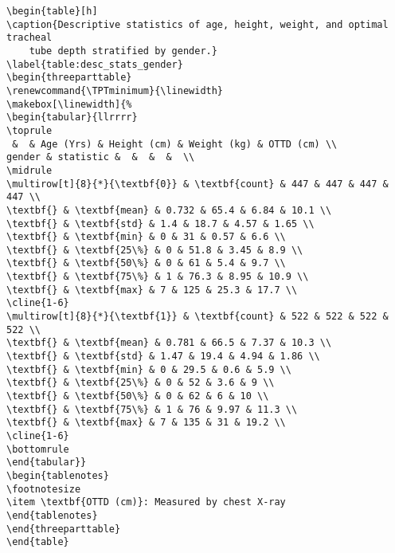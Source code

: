 \documentclass[11pt]{article}
\begin{document}
\begin{Verbatim}[tabsize=4]
\begin{table}[h]
\caption{Descriptive statistics of age, height, weight, and optimal tracheal
	tube depth stratified by gender.}
\label{table:desc_stats_gender}
\begin{threeparttable}
\renewcommand{\TPTminimum}{\linewidth}
\makebox[\linewidth]{%
\begin{tabular}{llrrrr}
\toprule
 &  & Age (Yrs) & Height (cm) & Weight (kg) & OTTD (cm) \\
gender & statistic &  &  &  &  \\
\midrule
\multirow[t]{8}{*}{\textbf{0}} & \textbf{count} & 447 & 447 & 447 & 447 \\
\textbf{} & \textbf{mean} & 0.732 & 65.4 & 6.84 & 10.1 \\
\textbf{} & \textbf{std} & 1.4 & 18.7 & 4.57 & 1.65 \\
\textbf{} & \textbf{min} & 0 & 31 & 0.57 & 6.6 \\
\textbf{} & \textbf{25\%} & 0 & 51.8 & 3.45 & 8.9 \\
\textbf{} & \textbf{50\%} & 0 & 61 & 5.4 & 9.7 \\
\textbf{} & \textbf{75\%} & 1 & 76.3 & 8.95 & 10.9 \\
\textbf{} & \textbf{max} & 7 & 125 & 25.3 & 17.7 \\
\cline{1-6}
\multirow[t]{8}{*}{\textbf{1}} & \textbf{count} & 522 & 522 & 522 & 522 \\
\textbf{} & \textbf{mean} & 0.781 & 66.5 & 7.37 & 10.3 \\
\textbf{} & \textbf{std} & 1.47 & 19.4 & 4.94 & 1.86 \\
\textbf{} & \textbf{min} & 0 & 29.5 & 0.6 & 5.9 \\
\textbf{} & \textbf{25\%} & 0 & 52 & 3.6 & 9 \\
\textbf{} & \textbf{50\%} & 0 & 62 & 6 & 10 \\
\textbf{} & \textbf{75\%} & 1 & 76 & 9.97 & 11.3 \\
\textbf{} & \textbf{max} & 7 & 135 & 31 & 19.2 \\
\cline{1-6}
\bottomrule
\end{tabular}}
\begin{tablenotes}
\footnotesize
\item \textbf{OTTD (cm)}: Measured by chest X-ray
\end{tablenotes}
\end{threeparttable}
\end{table}

\end{Verbatim}
\end{document}
